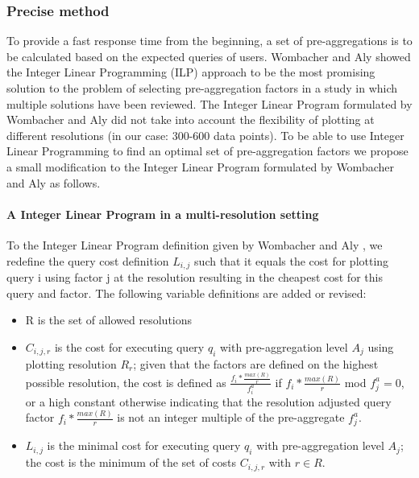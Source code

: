 \subsubsection{Precise method}
To provide a fast response time from the beginning, a set of pre-aggregations is to be calculated based on the expected queries of users. Wombacher and Aly \cite{wombacher2011} showed the Integer Linear Programming (ILP) approach to be the most promising solution to the problem of selecting pre-aggregation factors in a study in which multiple solutions have been reviewed. The Integer Linear Program formulated by Wombacher and Aly \cite{wombacher2011} did not take into account the flexibility of plotting at different resolutions (in our case: 300-600 data points). To be able to use Integer Linear Programming to find an optimal set of pre-aggregation factors we propose a small modification to the Integer Linear Program formulated by Wombacher and Aly \cite{wombacher2011} as follows.
\paragraph{A Integer Linear Program in a multi-resolution setting}
To the Integer Linear Program definition given by Wombacher and Aly \cite{wombacher2011}, we redefine the query cost definition $L_{i,j}$ such that it equals the cost for plotting query i using factor j at the resolution resulting in the cheapest cost for this query and factor. The following variable definitions are added or revised:
\begin{itemize}
\item R is the set of allowed resolutions
\item $C_{i,j,r}$ is the cost for executing query $q_{i}$ with pre-aggregation level $A_{j}$ using plotting resolution $R_{r}$; given that the factors are defined on the highest possible resolution, the cost is defined as $\frac{f_{i}*\frac{max(R)}{r}}{f_{i}^a}$ if $f_{i}*\frac{max(R)}{r}$ mod $f_{j}^a = 0$, or a high constant otherwise indicating that the resolution adjusted query factor $f_{i}*\frac{max(R)}{r}$ is not an integer multiple of the pre-aggregate $f_{j}^a$.
\item $L_{i,j}$ is the minimal cost for executing query $q_{i}$ with pre-aggregation level $A_{j}$; the cost is the minimum of the set of costs $C_{i,j,r}$ with $r \in R$.
\end{itemize}


